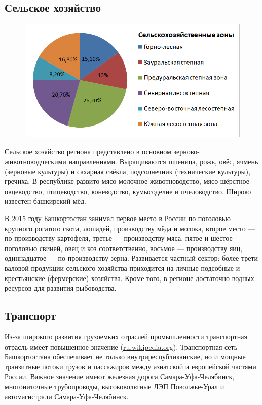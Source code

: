 \subsection{Сельское хозяйство}

\begin{figure}
\includegraphics[width=1\linewidth]{pics/sasha/zones}
\end{figure}

Сельское хозяйство региона представлено в основном зерново-животноводческими направлениями. Выращиваются пшеница, рожь, овёс, ячмень (зерновые культуры) и сахарная свёкла, подсолнечник (технические культуры), гречиха. В республике развито мясо-молочное животноводство, мясо-шёрстное овцеводство, птицеводство, коневодство, кумысоделие и пчеловодство. Широко известен башкирский мёд.

В 2015 году Башкортостан занимал первое место в России по поголовью крупного рогатого скота, лошадей, производству мёда и молока, второе место — по производству картофеля, третье — производству мяса, пятое и шестое — поголовью свиней, овец и коз соответственно, восьмое — производству яиц, одиннадцатое — по производству зерна. Развивается частный сектор: более трети валовой продукции сельского хозяйства приходится на личные подсобные и крестьянские (фермерские) хозяйства. Кроме того, в регионе достаточно водных ресурсов для развития рыбоводства.

\subsection{Транспорт} 

Из-за широкого развития грузоемких отраслей промышленности транспортная отрасль имеет повышенное значение (\href{https://ru.wikipedia.org/?oldid=99559170}{ru.wikipedia.org}). Транспортная сеть Башкортостана обеспечивает не только внутриреспубликанские, но и мощные транзитные потоки грузов и пассажиров между азиатской и европейской частями России. Важное значение имеют железная дорога Самара-Уфа-Челябинск, многониточные трубопроводы, высоковольтные ЛЭП Поволжье-Урал и автомагистрали Самара-Уфа-Челябинск.


